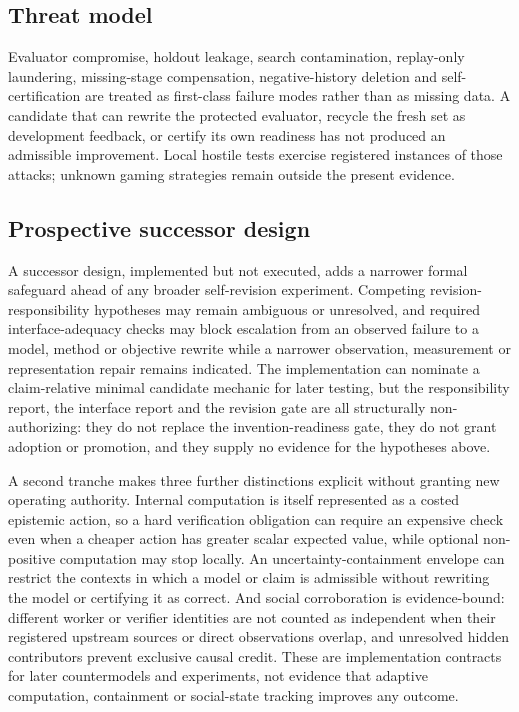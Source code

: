 \subsection{Threat model}

Evaluator compromise, holdout leakage, search contamination, replay-only laundering, missing-stage compensation, negative-history deletion and self-certification are treated as first-class failure modes rather than as missing data. A candidate that can rewrite the protected evaluator, recycle the fresh set as development feedback, or certify its own readiness has not produced an admissible improvement. Local hostile tests exercise registered instances of those attacks; unknown gaming strategies remain outside the present evidence.

\subsection{Prospective successor design}

A successor design, implemented but not executed, adds a narrower formal safeguard ahead of any broader self-revision experiment. Competing revision-responsibility hypotheses may remain ambiguous or unresolved, and required interface-adequacy checks may block escalation from an observed failure to a model, method or objective rewrite while a narrower observation, measurement or representation repair remains indicated. The implementation can nominate a claim-relative minimal candidate mechanic for later testing, but the responsibility report, the interface report and the revision gate are all structurally non-authorizing: they do not replace the invention-readiness gate, they do not grant adoption or promotion, and they supply no evidence for the hypotheses above.

A second tranche makes three further distinctions explicit without granting new operating authority. Internal computation is itself represented as a costed epistemic action, so a hard verification obligation can require an expensive check even when a cheaper action has greater scalar expected value, while optional non-positive computation may stop locally. An uncertainty-containment envelope can restrict the contexts in which a model or claim is admissible without rewriting the model or certifying it as correct. And social corroboration is evidence-bound: different worker or verifier identities are not counted as independent when their registered upstream sources or direct observations overlap, and unresolved hidden contributors prevent exclusive causal credit. These are implementation contracts for later countermodels and experiments, not evidence that adaptive computation, containment or social-state tracking improves any outcome.

